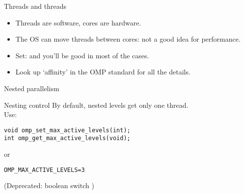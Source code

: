 \begin{numberedframe}{Threads and threads}
  \begin{itemize}    
  \item Threads are software, cores are hardware.
  \item The OS can move threads between cores: not a good idea for
    performance.
  \item Set:  and you'll be good in
    most of the cases.
  \item Look up `affinity' in the OMP standard for all the details.
  \end{itemize}
\end{numberedframe}

\begin{numberedframe}{Nested parallelism}
  
\end{numberedframe}

\begin{numberedframe}{Nesting control}
  By default, nested levels get only one thread.\\
  Use:
\begin{lstlisting}
void omp_set_max_active_levels(int);
int omp_get_max_active_levels(void);
\end{lstlisting}
or 
\begin{verbatim}
OMP_MAX_ACTIVE_LEVELS=3
\end{verbatim}
(Deprecated: boolean switch )
\end{numberedframe}

\endinput

\begin{numberedframe}{}
\begin{lstlisting}
\end{lstlisting}
\begin{itemize}
\item
\end{itemize}
\end{numberedframe}

